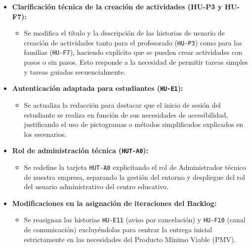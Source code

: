 \begin{itemize}
\item \textbf{Clarificación técnica de la creación de actividades (HU-P3 y HU-F7):}
\begin{itemize}
\item Se modifica el título y la descripción de las historias de usuario de creación de actividades tanto para el profesorado (\texttt{HU-P3}) como para las familias (\texttt{HU-F7}), haciendo explícito que se pueden crear actividades con pasos o sin pasos. Esto responde a la necesidad de permitir tareas simples y tareas guiadas secuencialmente.
\end{itemize}\item \textbf{Autenticación adaptada para estudiantes (\texttt{HU-E1}):}
\begin{itemize}
    \item Se actualiza la redacción para destacar que el inicio de sesión del estudiante se realiza en función de sus necesidades de accesibilidad, justificando el uso de pictogramas o métodos simplificados explicados en los escenarios.
\end{itemize}

\item \textbf{Rol de administración técnica (\texttt{HUT-A0}):}
\begin{itemize}
    \item Se redefine la tarjeta \texttt{HUT-A0} explicitando el rol de Administrador técnico de nuestra empresa, separando la gestión del entorno y despliegue del rol del usuario administrativo del centro educativo.
\end{itemize}

\item \textbf{Modificaciones en la asignación de iteraciones del Backlog:}
\begin{itemize}
    \item Se reasignan las historias \texttt{HU-E11} (aviso por cancelación) y \texttt{HU-F10} (canal de comunicación) excluyéndolas para centrar la entrega inicial estrictamente en las necesidades del Producto Mínimo Viable (PMV).
\end{itemize}
\end{itemize}